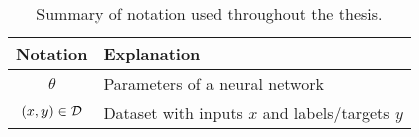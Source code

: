 \begin{table}[t!]
    \centering
    \begin{tabular}{cl}
        \toprule
        \textbf{Notation} & \textbf{Explanation} \\
        \midrule

        $\theta$             & Parameters of a neural network \\
        $(x,y) \in \mathcal{D}$    & Dataset with inputs $x$ and labels/targets $y$ \\
        
        

        \bottomrule
    \end{tabular}
    \caption{\label{tab:notation} Summary of notation used throughout the thesis.}
\end{table}
\clearpage